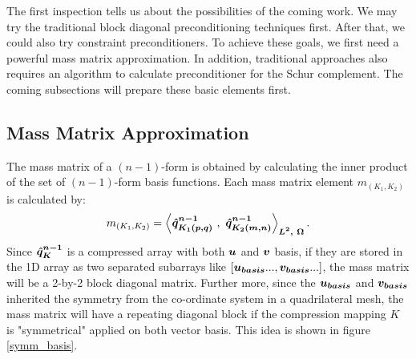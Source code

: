 The first inspection tells us about the possibilities of the coming work. We may try the traditional block diagonal preconditioning techniques first. After that, we could also try constraint preconditioners. To achieve these goals, we first need a powerful mass matrix approximation. In addition, traditional approaches also requires an algorithm to calculate preconditioner for the Schur complement. The coming subsections will prepare these basic elements first.  \\

\subsection{Mass Matrix Approximation}
The mass matrix of a $(n-1)$-form is obtained by calculating the inner product of the set of $(n-1)$-form basis functions.
Each mass matrix element $m_{(K_1,K_2)}$ is calculated by: 
\begin{equation}
	m_{(K_1,K_2)} = \left\langle \vect{\hat{q}^{n-1}_{K_1(p,q)}} \ ,\ \vect{\hat{q}^{n-1}_{K_2(m,n)}} \right\rangle _{\vect{L^2,\ \Omega}} .
\end{equation}
Since $\boldsymbol{\hat{q}^{n-1}_{K}}$ is a compressed array with both $\boldsymbol{u}$ and $\boldsymbol{v}$ basis, if they are stored in the 1D array as two separated subarrays like $[\boldsymbol{u_{basis}}...,\boldsymbol{v_{basis}}...]$, the mass matrix will be a 2-by-2 block diagonal matrix. Further more, since the $\boldsymbol{u_{basis}}$ and $\boldsymbol{v_{basis}}$ inherited the symmetry from the co-ordinate system in a quadrilateral mesh, the mass matrix will have a repeating diagonal block if the compression mapping $K$ is "symmetrical" applied on both vector basis. This idea is shown in figure \ref{symm_basis}.\\
 
